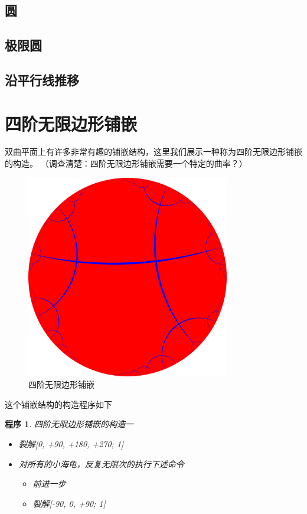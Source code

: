 \documentclass[a4paper,12pt]{article}
\newtheorem{program}{程序}
\begin{document}
\newpage

\subsection{圆}

\newpage

\subsection{极限圆}

\newpage

\subsection{沿平行线推移}

\newpage

\section{四阶无限边形铺嵌}

双曲平面上有许多非常有趣的铺嵌结构，这里我们展示一种称为四阶无限边形铺嵌的构造。
（调查清楚：四阶无限边形铺嵌需要一个特定的曲率？）

\begin{figure}[ht]
\centering
\includegraphics[width=3.5in]{images/H2_tiling_24i-1.png}
\caption{四阶无限边形铺嵌}
\end{figure}

这个铺嵌结构的构造程序如下

\begin{program}
四阶无限边形铺嵌的构造一
\begin{itemize}
\item 裂解[0, +90, +180, +270; 1]
\item 对所有的小海龟，反复无限次的执行下述命令
\begin{itemize}\item 前进一步 \item 裂解[-90, 0, +90; 1] \end{itemize}
\end{itemize}
\end{program}
\end{document}

